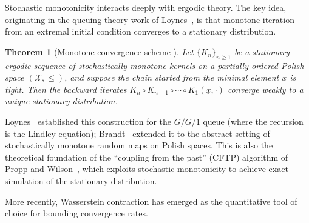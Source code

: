\documentclass[11pt,a4paper]{article}
\theoremstyle{plain}
\newtheorem{theorem}{Theorem}[section]
\theoremstyle{definition}
\theoremstyle{remark}
\begin{document}
Stochastic monotonicity interacts deeply with ergodic theory.  The key idea, originating
in the queuing theory work of Loynes~\cite{loynes1962}, is that monotone iteration
from an extremal initial condition converges to a stationary distribution.


\begin{theorem}[Monotone-convergence scheme {\cite{loynes1962,brandt1986}}]
\label{thm:loynes}
Let $\{K_n\}_{n \geq 1}$ be a stationary ergodic sequence of stochastically monotone
kernels on a partially ordered Polish space $(\mathcal{X}, \leq)$, and suppose the
chain started from the minimal element $\underline{x}$ is tight.  Then the backward
iterates $K_n \circ K_{n-1} \circ \cdots \circ K_1(\underline{x}, \cdot)$ converge
weakly to a unique stationary distribution.
\end{theorem}

Loynes~\cite{loynes1962} established this construction for the $G/G/1$ queue (where the
recursion is the Lindley equation); Brandt~\cite{brandt1986} extended it to the abstract
setting of stochastically monotone random maps on Polish spaces.
This is also the theoretical foundation of the ``coupling from the past'' (CFTP) algorithm
of Propp and Wilson~\cite{proppwilson1996}, which exploits stochastic monotonicity to
achieve exact simulation of the stationary distribution.

More recently, Wasserstein contraction has emerged as the quantitative tool of choice
for bounding convergence rates.


\end{document}
